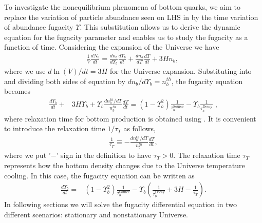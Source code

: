  
To investigate the nonequilibrium phenomena of bottom quarks, we aim to replace the variation of particle abundance seen on LHS in  by the time variation of abundance fugacity $\Upsilon$.
This substitution allows us to derive the dynamic equation for the fugacity parameter and enables us to study the fugacity as a function of time. Considering the expansion of the Universe we have
\begin{align}\label{number_dilution}
\frac{1}{V}\frac{dN_b}{dt}=\frac{dn_b}{d\Upsilon_b}\frac{d\Upsilon_b}{dt}+\frac{dn_b}{dT}\frac{dT}{dt}+3Hn_b,\;
\end{align}
where we use $d\ln(V)/dt=3H$ for the Universe expansion. Substituting  into  and dividing both sides of equation by $dn_b/{d\Upsilon_b}=n^{th}_b$, the fugacity equation becomes
\begin{align}
\frac{d\Upsilon_b}{dt}+&3H\Upsilon_b+\Upsilon_b\frac{dn^{th}_b/dT}{n^{th}_b}\frac{dT}{dt}=\left(1-\Upsilon_b^2\right)\frac{1}{\tau_{b}^{\mathrm{Source}}}-\Upsilon_b\frac{1}{\tau^{\mathrm{Decay}}_b}\;,
\end{align}
where relaxation time for bottom production is obtained using . It is convenient to introduce the relaxation time $1/\tau_T$ as follows,
\begin{align}
\frac{1}{\tau_T}\equiv-\frac{dn^{th}_b/dT}{n^{th}_b}\frac{dT}{dt},
\end{align}
where we put '$-$' sign in the definition to have $\tau_T>0$. The relaxation time $\tau_T$ represents how the bottom density changes due to the Universe temperature cooling. In this case, the fugacity equation can be written as
\begin{align}\label{Fugacity_Eq0}
\frac{d\Upsilon_b}{dt}\!\!=&(1-\Upsilon_{b}^2)\frac{1}{\tau_{b}^{\mathrm{Source}}}
\!-\!\Upsilon_{b}\left(\frac{1}{\tau^{\mathrm{Decay}}_b}+3H\!-\!\frac{1}{\tau_T}\right).
\end{align}
In following sections we will solve the fugacity differential equation in two different scenarios: stationary and nonstationary Universe.

